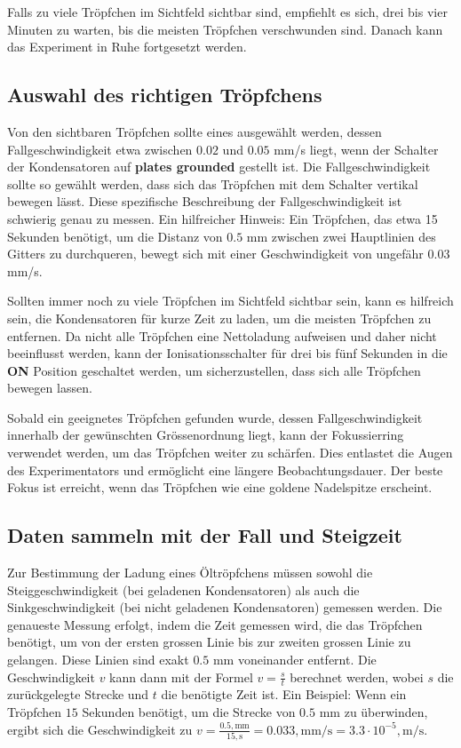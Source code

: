 Falls zu viele Tröpfchen im Sichtfeld sichtbar sind, empfiehlt es sich, drei bis vier Minuten zu warten, bis die meisten Tröpfchen verschwunden sind. Danach kann das Experiment in Ruhe fortgesetzt werden.

\subsection{Auswahl des richtigen Tröpfchens}\label{sub:auswahlTropfen}
Von den sichtbaren Tröpfchen sollte eines ausgewählt werden, dessen Fallgeschwindigkeit etwa zwischen $0.02$ und $0.05$ mm/s liegt, wenn der Schalter der Kondensatoren auf \textbf{plates grounded} gestellt ist. Die Fallgeschwindigkeit sollte so gewählt werden, dass sich das Tröpfchen mit dem Schalter vertikal bewegen lässt. Diese spezifische Beschreibung der Fallgeschwindigkeit ist schwierig genau zu messen. Ein hilfreicher Hinweis: Ein Tröpfchen, das etwa 15 Sekunden benötigt, um die Distanz von $0.5$ mm zwischen zwei Hauptlinien des Gitters zu durchqueren, bewegt sich mit einer Geschwindigkeit von ungefähr $0.03$ mm/s.

Sollten immer noch zu viele Tröpfchen im Sichtfeld sichtbar sein, kann es hilfreich sein, die Kondensatoren für kurze Zeit zu laden, um die meisten Tröpfchen zu entfernen. Da nicht alle Tröpfchen eine Nettoladung aufweisen und daher nicht beeinflusst werden, kann der Ionisationsschalter für drei bis fünf Sekunden in die \textbf{ON} Position geschaltet werden, um sicherzustellen, dass sich alle Tröpfchen bewegen lassen.

Sobald ein geeignetes Tröpfchen gefunden wurde, dessen Fallgeschwindigkeit innerhalb der gewünschten Grössenordnung liegt, kann der Fokussierring verwendet werden, um das Tröpfchen weiter zu schärfen. Dies entlastet die Augen des Experimentators und ermöglicht eine längere Beobachtungsdauer. Der beste Fokus ist erreicht, wenn das Tröpfchen wie eine goldene Nadelspitze erscheint.

\subsection{Daten sammeln mit der Fall und Steigzeit}\label{sub:datenFallundSteig}
Zur Bestimmung der Ladung eines Öltröpfchens müssen sowohl die Steiggeschwindigkeit (bei geladenen Kondensatoren) als auch die Sinkgeschwindigkeit (bei nicht geladenen Kondensatoren) gemessen werden. Die genaueste Messung erfolgt, indem die Zeit gemessen wird, die das Tröpfchen benötigt, um von der ersten grossen Linie bis zur zweiten grossen Linie zu gelangen. Diese Linien sind exakt $0.5$ mm voneinander entfernt. Die Geschwindigkeit $v$ kann dann mit der Formel $v = \frac{s}{t}$ berechnet werden, wobei $s$ die zurückgelegte Strecke und $t$ die benötigte Zeit ist. Ein Beispiel: Wenn ein Tröpfchen $15$ Sekunden benötigt, um die Strecke von $0.5$ mm zu überwinden, ergibt sich die Geschwindigkeit zu $v = \frac{0.5,\text{mm}}{15,\text{s}} = 0.033,\text{mm/s} = 3.3 \cdot 10^{-5},\text{m/s}$.

